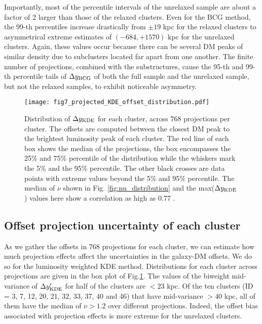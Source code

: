 \documentclass[usenatbib]{mn2e}
\newcommand{\sigmaSIDM}{\sigma_{\rm SIDM}}
\begin{document}
{Importantly, most of the percentile intervals of the unrelaxed sample are about a factor of 2 larger than those of the relaxed clusters. 
Even for the BCG method, the 99-th percentiles increase drastically
from $\pm 19$ kpc for the relaxed clusters to asymmetrical extreme estimates of $(-684, +1570)$ kpc for the unrelaxed clusters.
Again, these values occur because there can be several DM peaks of
similar density due to subclusters located far apart from one another.
The finite number of projections, combined with the substructures, cause 
the 95-th and 99-th percentile tails of $\Delta y_{\rm BCG}$ of both the full
sample and the unrelaxed sample, but not the relaxed samples, to exhibit 
noticeable asymmetry.




\begin{figure}
\begin{center}
	\texttt{[image: fig7\_projected\_KDE\_offset\_distribution.pdf]}

	\caption{ 
	   Distribution of $\Delta y_{\rm KDE}$ for each cluster, across 768 projections per cluster. 
		The offsets are computed between the closest DM 
		peak to the brightest luminosity peak of each cluster. 		
		The red line of each box shows the median of the projections,
		the box encompasses the 25\% and 75\% percentile of the distribution while
		the whiskers mark the 5\% and the 95\% percentile. The other black crosses
		are data points with extreme values beyond the 5\% and 95\% percentile.
		The median of $\nu$ shown in Fig. \ref{fig:nu_distribution} and the max($\Delta y_{\rm KDE}$) values here show a correlation as high as 0.77
		\label{fig:projected_KDE_offset_distribution}.
	}

\end{center}	
\end{figure}


\subsection{Offset projection uncertainty of each cluster}
\label{subsec:projections}
As we gather the offsets in 768 projections for each cluster, we can estimate how much projection effects affect the uncertainties in the galaxy-DM offsets. We do so for the luminosity weighted KDE method. Distributions for each cluster across projections are given in the box plot of Fig.\ref{fig:projected_KDE_offset_distribution}. The values of the biweight 
mid-variance of $\Delta y_{\rm KDE}'$ for half of the clusters
are $< 23$ kpc. Of the ten clusters (ID = 3, 7, 12, 20, 21, 32, 33, 37, 40 and 46) that have mid-variance $ > 40$ kpc, all of them have the median of $\nu > 1.2$
over different projections. Indeed, the offset bias associated with projection effects is more extreme for the unrelaxed clusters. 
 
}
\end{document}
